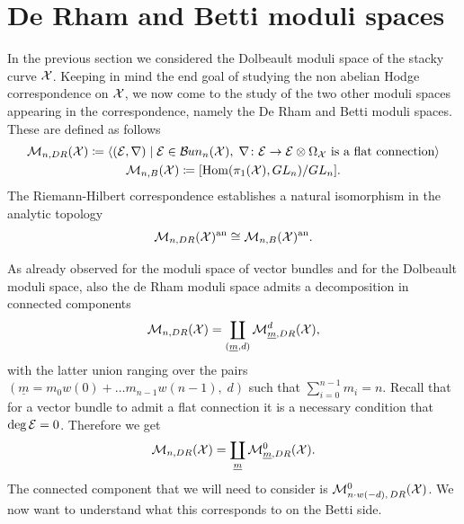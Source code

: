 \documentclass{article}
\begin{document}
\section{De Rham and Betti moduli spaces}
In the previous section we considered the Dolbeault moduli space of the stacky curve $\mathcal{X}$. Keeping in mind the end goal of studying the non abelian Hodge correspondence on $\mathcal{X}$, we now come to the study of the two other moduli spaces appearing in the correspondence, namely the De Rham and Betti moduli spaces.
These are defined as follows
\begin{gather}
\mathcal{M}_{n, DR}(\mathcal{X}) \coloneqq \left< (\mathcal{E}, \nabla) \;\middle|\; \mathcal{E}\in \mathcal{B}\kern -.5pt un_n(\mathcal{X}), \; \nabla\colon \mathcal{E} \to \mathcal{E}\otimes \Omega_{\mathcal{X}} \text{ is a flat connection} \right> \\
\mathcal{M}_{n, B}(\mathcal{X}) \coloneqq [\operatorname{Hom}(\pi_1(\mathcal{X}), GL_n) / GL_n].
\end{gather}
The Riemann-Hilbert correspondence establishes a natural isomorphism in the analytic topology
\begin{equation}
\mathcal{M}_{n, DR}(\mathcal{X})^{\text{an}} \cong \mathcal{M}_{n, B}(\mathcal{X})^{\text{an}}.
\end{equation}

As already observed for the moduli space of vector bundles and for the Dolbeault moduli space, also the de Rham moduli space admits a decomposition in connected components
\begin{equation}
\mathcal{M}_{n, DR}(\mathcal{X}) = \coprod_{(\underline{m}, d)} \mathcal{M}_{\underline{m}, DR}^d(\mathcal{X}),
\end{equation}
with the latter union ranging over the pairs $(\underline{m} = m_0 w(0)+ \dots m_{n-1} w(n-1), \; d)$ such that $\sum_{i=0}^{n-1}m_{i} = n$.
{\color{blue} Recall that for a vector bundle to admit a flat connection it is a necessary condition that $\deg \mathcal{E} = 0$.} Therefore we get
\begin{equation} \label{eq: decomposition of MDR}
\mathcal{M}_{n, DR}(\mathcal{X}) = \coprod_{\underline{m}} \mathcal{M}_{\underline{m}, DR}^0(\mathcal{X}).
\end{equation}
The connected component that we will need to consider is $\mathcal{M}_{n \cdot w(-d), \, DR}^0(\mathcal{X})$.
We now want to understand what this corresponds to on the Betti side.
\end{document}
